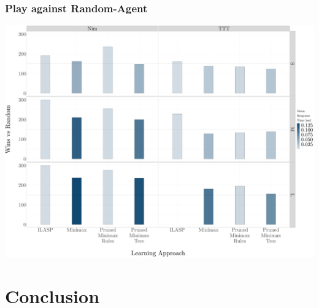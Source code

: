 \documentclass{beamer}
\begin{document}
\begin{framefont}{\footnotesize}
  \begin{frame}
    \frametitle{Play against Random-Agent}
    \includegraphics[width=\textwidth,height=0.9\textheight,keepaspectratio]{bar_vs.pdf}
  \end{frame}
\end{framefont}


\section{Conclusion}
\end{document}
